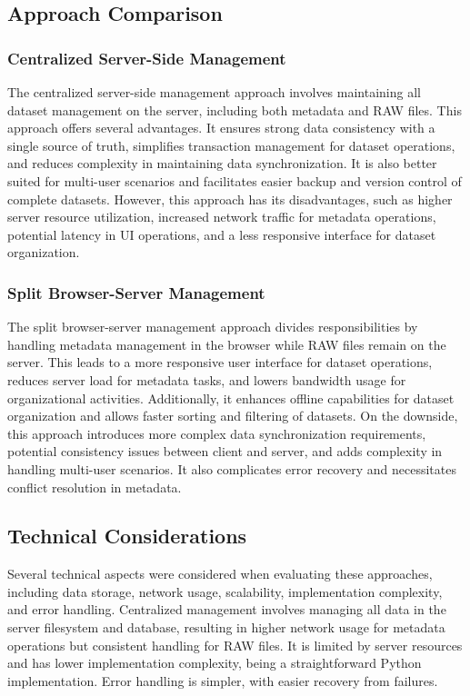 \subsection{Approach Comparison}

\subsubsection{Centralized Server-Side Management}

The centralized server-side management approach involves maintaining all dataset management on the server, including both metadata and RAW files. This approach offers several advantages. It ensures strong data consistency with a single source of truth, simplifies transaction management for dataset operations, and reduces complexity in maintaining data synchronization. It is also better suited for multi-user scenarios and facilitates easier backup and version control of complete datasets. However, this approach has its disadvantages, such as higher server resource utilization, increased network traffic for metadata operations, potential latency in UI operations, and a less responsive interface for dataset organization.

\subsubsection{Split Browser-Server Management}

The split browser-server management approach divides responsibilities by handling metadata management in the browser while RAW files remain on the server. This leads to a more responsive user interface for dataset operations, reduces server load for metadata tasks, and lowers bandwidth usage for organizational activities. Additionally, it enhances offline capabilities for dataset organization and allows faster sorting and filtering of datasets. On the downside, this approach introduces more complex data synchronization requirements, potential consistency issues between client and server, and adds complexity in handling multi-user scenarios. It also complicates error recovery and necessitates conflict resolution in metadata.

\subsection{Technical Considerations}

Several technical aspects were considered when evaluating these approaches, including data storage, network usage, scalability, implementation complexity, and error handling. Centralized management involves managing all data in the server filesystem and database, resulting in higher network usage for metadata operations but consistent handling for RAW files. It is limited by server resources and has lower implementation complexity, being a straightforward Python implementation. Error handling is simpler, with easier recovery from failures.

